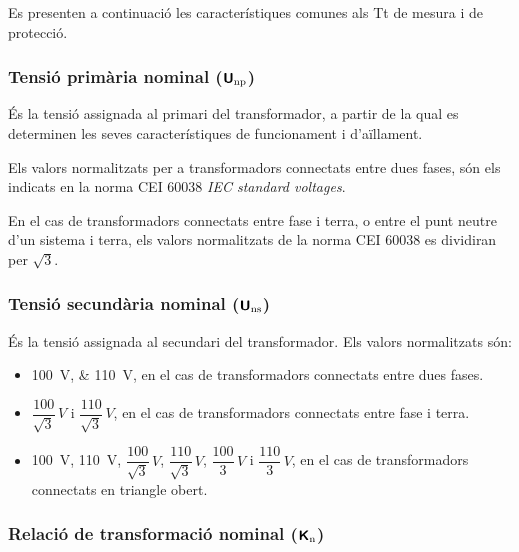 Es presenten a continuació les característiques comunes als Tt de
mesura i de protecció.

\subsubsection{Tensió primària nominal (${\boldsymbol{\mathsf{U_\text{np}}}}$)}

És la tensió assignada al primari del transformador, a partir de la
qual es determinen les seves característiques de funcionament i
d'aïllament.

Els valors normalitzats per a transformadors connectats entre dues fases, són els indicats en la norma CEI 60038 \textit{IEC standard voltages}.

En el cas de transformadors connectats entre fase i terra, o entre el punt neutre d'un sistema i terra, els valors normalitzats de la norma CEI 60038 es dividiran per $\sqrt{3}$.


\subsubsection{Tensió secundària nominal (${\boldsymbol{\mathsf{U_\text{ns}}}}$)}

És la tensió assignada al secundari del transformador.
Els valors normalitzats són:
\begin{itemize}
    \item \qtylist{100;110}{V}, en el cas de transformadors connectats
    entre dues fases.
    \item $\dfrac{100}{\sqrt{3}}\si{\,V}$ i
        $\dfrac{110}{\sqrt{3}}\si{\,V}$, en el cas de transformadors
        connectats entre fase i terra.
    \item \qty{100}{V}, \qty{110}{V}, $\dfrac{100}{\sqrt{3}}\si{\,V}$,
    $\dfrac{110}{\sqrt{3}}\si{\,V}$, $\dfrac{100}{3}\si{\,V}$   i
    $\dfrac{110}{3}\si{\,V}$, en el cas de transformadors
    connectats en triangle obert.
\end{itemize}

\subsubsection{Relació de transformació nominal (${\boldsymbol{\mathsf{K_\text{n}}}}$)}


